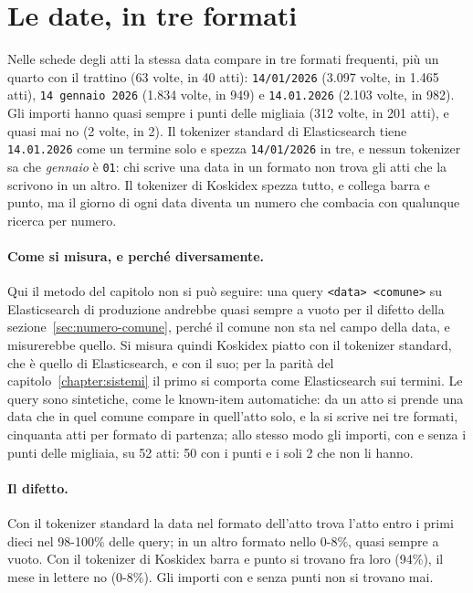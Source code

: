 \section{Le date, in tre formati}\label{sec:date}

Nelle schede degli atti la stessa data compare in tre formati frequenti, più un quarto con il trattino
(63 volte, in 40 atti):
\texttt{14/01/2026} (3.097 volte, in 1.465 atti), \texttt{14 gennaio 2026}
(1.834 volte, in 949) e \texttt{14.01.2026} (2.103 volte, in 982). Gli importi
hanno quasi sempre i punti delle migliaia (312 volte, in 201 atti), e quasi mai
no (2 volte, in 2). Il tokenizer standard di Elasticsearch tiene
\texttt{14.01.2026} come un termine solo e spezza \texttt{14/01/2026} in tre, e
nessun tokenizer sa che \emph{gennaio} è \texttt{01}: chi scrive una data in un
formato non trova gli atti che la scrivono in un altro. Il tokenizer di
Koskidex spezza tutto, e collega barra e punto, ma il giorno di ogni data
diventa un numero che combacia con qualunque ricerca per numero.

\paragraph{Come si misura, e perché diversamente.} Qui il metodo del capitolo
non si può seguire: una query \texttt{<data> <comune>} su Elasticsearch di
produzione andrebbe quasi sempre a vuoto per il difetto della
sezione~\ref{sec:numero-comune}, perché il comune non sta nel campo della data,
e misurerebbe quello. Si misura quindi Koskidex piatto con il tokenizer
standard, che è quello di Elasticsearch, e con il suo; per la parità del
capitolo~\ref{chapter:sistemi} il primo si comporta come Elasticsearch sui
termini. Le query sono sintetiche, come le known-item automatiche: da un atto
si prende una data che in quel comune compare in quell'atto solo, e la si
scrive nei tre formati, cinquanta atti per formato di partenza; allo stesso modo
gli importi, con e senza i punti delle migliaia, su 52 atti: 50 con i punti e i
soli 2 che non li hanno.

\paragraph{Il difetto.} Con il tokenizer standard la data nel formato dell'atto
trova l'atto entro i primi dieci nel 98-100\% delle query; in un altro formato
nello 0-8\%, quasi sempre a vuoto. Con il tokenizer di Koskidex barra e punto si
trovano fra loro (94\%), il mese in lettere no (0-8\%). Gli importi con e senza
punti non si trovano mai.

